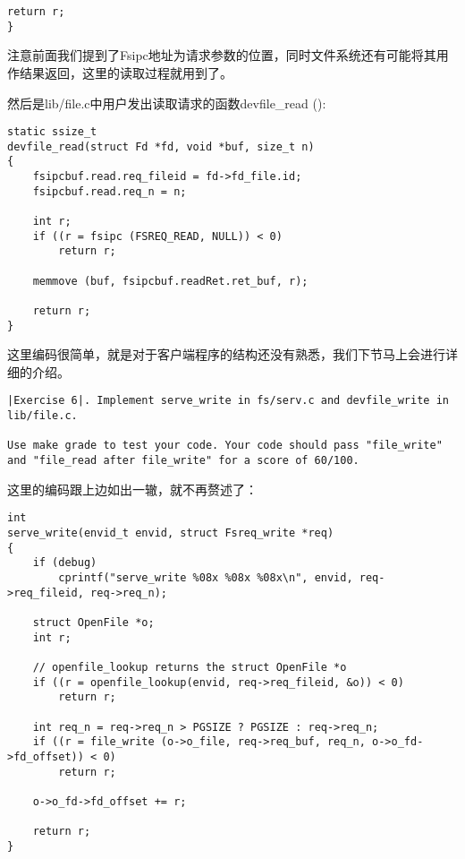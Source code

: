 \documentclass{article}
\newcommand{\funcname}[1]{{\ttfamily \small #1}}
\begin{document}
\begin{CJK*}{UTF8}{gkai}
\begin{lstlisting}[style=ccode, title={\scriptsize \ttfamily \bfseries fs/serv.c: serve\_read()}]
    return r;
}
\end{lstlisting}

注意前面我们提到了Fsipc地址为请求参数的位置，同时文件系统还有可能将其用作结果返回，这里的读取过程就用到了。

然后是lib/file.c中用户发出读取请求的函数\funcname{devfile\_read ()}:

\begin{lstlisting}[style=ccode, title={\scriptsize \ttfamily \bfseries lib/file.c: devfile\_read()}]
static ssize_t
devfile_read(struct Fd *fd, void *buf, size_t n)
{
    fsipcbuf.read.req_fileid = fd->fd_file.id;
    fsipcbuf.read.req_n = n;

    int r;
    if ((r = fsipc (FSREQ_READ, NULL)) < 0)
        return r;

    memmove (buf, fsipcbuf.readRet.ret_buf, r);

    return r;
}
\end{lstlisting}

这里编码很简单，就是对于客户端程序的结构还没有熟悉，我们下节马上会进行详细的介绍。

\vspace{2em}

\begin{lstlisting}[style=exercise]
|Exercise 6|. Implement serve_write in fs/serv.c and devfile_write in lib/file.c.

Use make grade to test your code. Your code should pass "file_write" and "file_read after file_write" for a score of 60/100.
\end{lstlisting}

这里的编码跟上边如出一辙，就不再赘述了：
\begin{lstlisting}[style=ccode, title={\scriptsize \ttfamily \bfseries fs/serv.c: serve\_write()}]
int
serve_write(envid_t envid, struct Fsreq_write *req)
{
    if (debug)
        cprintf("serve_write %08x %08x %08x\n", envid, req->req_fileid, req->req_n);

    struct OpenFile *o;
    int r;

    // openfile_lookup returns the struct OpenFile *o 
    if ((r = openfile_lookup(envid, req->req_fileid, &o)) < 0)
		return r;

    int req_n = req->req_n > PGSIZE ? PGSIZE : req->req_n;
    if ((r = file_write (o->o_file, req->req_buf, req_n, o->o_fd->fd_offset)) < 0)
        return r;

    o->o_fd->fd_offset += r;

    return r;
}
\end{lstlisting}


\end{CJK*}
\end{document}
